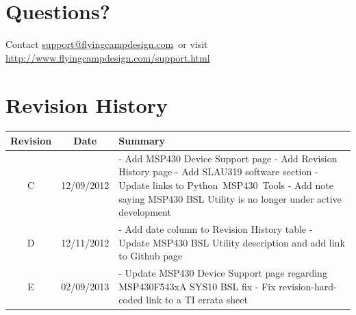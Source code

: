 \documentclass[10pt,letterpaper]{datasheet}
\makeatletter
\newcommand{\fcdsupportemail}{\href{mailto:support@flyingcampdesign.com}{support@flyingcampdesign.com}}
\newcommand{\fcdsupporturl}{\href{http://www.flyingcampdesign.com/support.html}{http://www.flyingcampdesign.com/support.html}}
\newcommand{\pmt}{Python~MSP430~Tools}
\makeatother
\begin{document}
\newpage

\section*{Questions?}
Contact \fcdsupportemail\ or visit \fcdsupporturl

\newpage

\section*{Revision History}
\label{tab:revision-history}
\begin{tabularx}{\textwidth}{|c|c|X|}
  \hline
  Revision &
  Date &
  Summary \\
  \hline
  C & 12/09/2012 & - Add MSP430 Device Support page \newline %
                   - Add Revision History page \newline %
                   - Add SLAU319 software section \newline %
                   - Update links to \pmt \newline %
                   - Add note saying MSP430 BSL Utility is no longer under active development \\
  \hline
  D & 12/11/2012 & - Add date column to Revision History table \newline %
                   - Update MSP430 BSL Utility description and add link to Github page \\
  \hline
  E & 02/09/2013 & - Update MSP430 Device Support page regarding MSP430F543xA SYS10 BSL fix  \newline %
                   - Fix revision-hard-coded link to a TI errata sheet \\
  \hline
\end{tabularx}

\newpage


\end{document}
